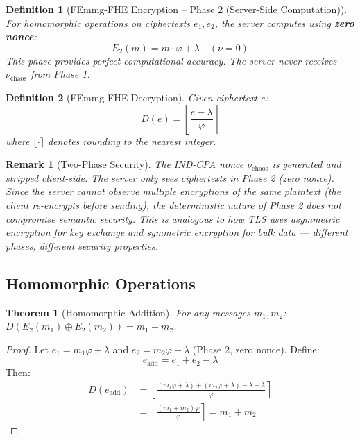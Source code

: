 \documentclass{article}
\newtheorem{theorem}{Theorem}[section]
\newtheorem{definition}{Definition}[section]
\newtheorem{remark}{Remark}[section]
\begin{document}
\begin{definition}[FEmmg-FHE Encryption -- Phase 2 (Server-Side Computation)]
For homomorphic operations on ciphertexts $e_1, e_2$, the server computes using \textbf{zero nonce}:
\begin{equation}
E_2(m) = m \cdot \varphi + \lambda \quad (\nu = 0)
\end{equation}
This phase provides perfect computational accuracy. The server never receives $\nu_{\text{chaos}}$ from Phase 1.
\end{definition}

\begin{definition}[FEmmg-FHE Decryption]
Given ciphertext $e$:
\begin{equation}
D(e) = \left\lfloor \frac{e - \lambda}{\varphi} \right\rceil
\end{equation}
where $\lfloor \cdot \rceil$ denotes rounding to the nearest integer.
\end{definition}

\begin{remark}[Two-Phase Security]
The IND-CPA nonce $\nu_{\text{chaos}}$ is generated and stripped client-side. The server only sees ciphertexts in Phase 2 (zero nonce). Since the server cannot observe multiple encryptions of the same plaintext (the client re-encrypts before sending), the deterministic nature of Phase 2 does not compromise semantic security. This is analogous to how TLS uses asymmetric encryption for key exchange and symmetric encryption for bulk data --- different phases, different security properties.
\end{remark}

\subsection{Homomorphic Operations}

\begin{theorem}[Homomorphic Addition]
For any messages $m_1, m_2$: $D(E_2(m_1) \oplus E_2(m_2)) = m_1 + m_2$.
\end{theorem}

\begin{proof}
Let $e_1 = m_1\varphi + \lambda$ and $e_2 = m_2\varphi + \lambda$ (Phase 2, zero nonce). Define:
\begin{equation}
e_{\text{add}} = e_1 + e_2 - \lambda
\end{equation}
Then:
\begin{align}
D(e_{\text{add}}) &= \left\lfloor \frac{(m_1\varphi + \lambda) + (m_2\varphi + \lambda) - \lambda - \lambda}{\varphi} \right\rceil \nonumber\\
&= \left\lfloor \frac{(m_1 + m_2)\varphi}{\varphi} \right\rceil = m_1 + m_2
\end{align}
\end{proof}
\end{document}
